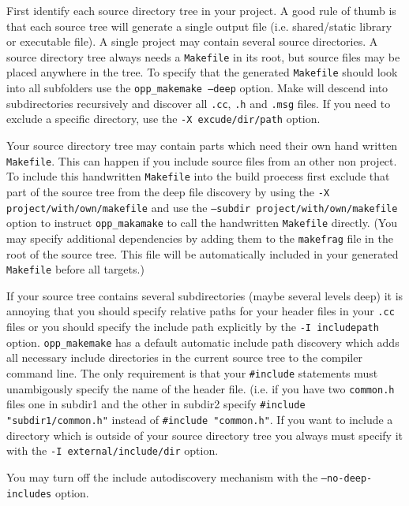 First identify each source directory tree in your project. A good rule of
thumb is that each source tree will generate a single output file
(i.e. shared/static library or executable file). A single project may contain
several source directories. A source directory tree always needs
a \texttt{Makefile} in its root, but source files may be placed anywhere
in the tree. To specify that the generated \texttt{Makefile} should look into all
subfolders use the \texttt{opp\_makemake --deep} option. Make will descend into
subdirectories recursively and discover all \texttt{.cc}, \texttt{.h} and \texttt{.msg}
files. If you need to exclude a specific directory, use the \texttt{-X excude/dir/path}
option.

Your source directory tree may contain parts which need their own hand written \texttt{Makefile}.
This can happen if you include source files from an other non {\opp} project. To
include this handwritten \texttt{Makefile} into the build proecess first exclude that part
of the source tree from the deep file discovery by using the \texttt{-X project/with/own/makefile}
and use the \texttt{--subdir project/with/own/makefile} option to instruct \texttt{opp\_makamake}
to call the handwritten \texttt{Makefile} directly. (You may specify additional dependencies by
adding them to the \texttt{makefrag} file in the root of the source tree. This file will be
automatically included in your generated \texttt{Makefile} before all targets.)

If your source tree contains several subdirectories (maybe several levels deep) it is
annoying that you should specify relative paths for your header files in your \texttt{.cc} files
or you should specify the include path explicitly by the \texttt{-I includepath} option.
\texttt{opp\_makemake} has a default automatic include path discovery which adds all necessary
include directories in the current source tree to the compiler command line. The only requirement is
that your \texttt{\#include} statements must unambigously specify the name of the header file.
(i.e. if you have two \texttt{common.h} files one in subdir1 and the other in subdir2 specify
\texttt{\#include "subdir1/common.h"} instead of \texttt{\#include "common.h"}. If you want to
include a directory which is outside of your source directory tree you always must specify it with
the \texttt{-I external/include/dir} option.

\begin{note}
You may turn off the include autodiscovery mechanism with the \texttt{--no-deep-includes} option.
\end{note}

